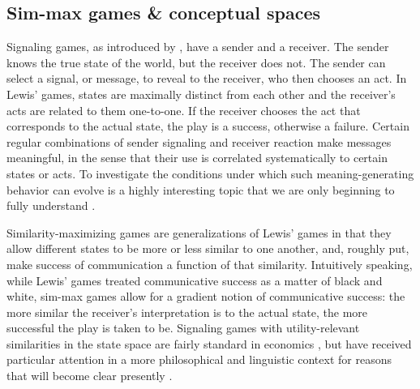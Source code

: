 \subsection{Sim-max games \& conceptual spaces}

Signaling games, as introduced by \citet{Lewis_1969:Convention}, have
a sender and a receiver. The sender knows the true state of the world,
but the receiver does not. The sender can select a signal, or message,
to reveal to the receiver, who then chooses an act. In Lewis' games,
states are maximally distinct from each other and the receiver's acts
are related to them one-to-one. If the receiver chooses the act that
corresponds to the actual state, the play is a success, otherwise a
failure. Certain regular combinations of sender signaling and receiver
reaction make messages meaningful, in the sense that their use is
correlated systematically to certain states or acts. To investigate
the conditions under which such meaning-generating behavior can evolve
is a highly interesting topic that we are only beginning to fully
understand
\citep[e.g.][]{Warneryd1993:Cheap-Talk-Coor,BlumeKim1993:Evolutionary-St,Zollman2005:Talking-to-Neig,Huttegger2007:Evolution-and-t,Pawlowitsch2008:Why-Evolution-d,Barrett2009:The-Evolution-o,Wagner2009:Communication-a,HutteggerSkyrms2010:Evolutionary-Dy,Skyrms2010:Signals,HutteggerZollman2011:Signaling-Games}.

Similarity-maximizing games are generalizations of Lewis' games in
that they allow different states to be more or less similar to one
another, and, roughly put, make success of communication a function of
that similarity. Intuitively speaking, while Lewis' games treated
communicative success as a matter of black and white, sim-max games
allow for a gradient notion of communicative success: the more similar
the receiver's interpretation is to the actual state, the more
successful the play is taken to be. Signaling games with
utility-relevant similarities in the state space are fairly standard
in economics
\citep[e.g.][]{Spence1973:Job-market-sign,CrawfordSobel1982:Strategic-Infor},
but have received particular attention in a more philosophical and
linguistic context for reasons that will become clear presently
\citep{Jager2007:The-Evolution-o,JagerRooijvan-Rooij2007:Language-Struct,JagerMetzger2011:Voronoi-Languag}.

